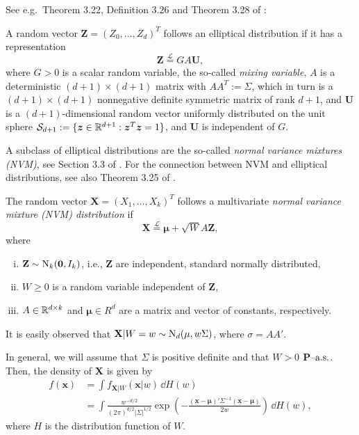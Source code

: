 \providecommand{\bZ}{\ensuremath{\bm{Z}}}
\providecommand{\bU}{\ensuremath{\bm{U}}}
\providecommand{\bu}{\ensuremath{\bm{u}}}

See e.g.\ Theorem 3.22, Definition 3.26 and Theorem 3.28 of
\citep{McNeil2005}:
\begin{definition}
  A random vector $\bZ=(Z_0,\ldots, Z_d)^T$ follows an elliptical
  distribution if it has a representation
  \begin{equation*}
    \bZ\stackrel{\mathcal L}= G A \bU,
  \end{equation*}
  where $G>0$ is a scalar random variable, the so-called {\em mixing
  variable}, $A$ is a deterministic $(d+1)\times (d+1)$ matrix with
$A A^T:=\Sigma$, which in turn is a $(d+1)\times (d+1)$ nonnegative
definite symmetric matrix of rank $d+1$, and $\bU$ is a
$(d+1)$-dimensional random vector uniformly distributed on the unit
sphere $\mathcal S_{d+1}:=\{\bm{z}\in {\mathbb{R}}^{d+1}: \bm z^T \bm z=1\}$,
and $\bU$ is independent of $G$.
\end{definition}

A subclass of elliptical distributions are the so-called {\em normal
  variance mixtures (NVM)}, see Section 3.3 of \citep{McNeil2005}. For the
connection between NVM and elliptical distributions, see also Theorem
3.25 of \citep{McNeil2005}. 

\begin{definition}
  The random vector $\mathbf X=(X_1, \ldots, X_k)^T$ follows a
  multivariate {\em normal variance mixture (NVM) distribution} if
  \begin{equation*}
    \mathbf X \stackrel{\mathcal L}{=} \mathbf \mu + \sqrt{W} A\mathbf
    Z, 
  \end{equation*}
  where
  \begin{enumerate}[(i)]
  \item $\mathbf Z\sim {\rm N}_k(\mathbf 0, I_k)$, i.e., $\mathbf Z$ are
    independent, standard normally distributed,
  \item $W\geq 0$ is a random variable independent of $\mathbf Z$,
  \item $A\in {\mathbb{R}}^{d\times k}$ and $\mathbf \mu\in R^d$ are a matrix
    and vector of constants, respectively. 
  \end{enumerate}
\end{definition}

It is easily observed that $\mathbf X|W=w \sim {\rm N}_d(\mathbf \mu,
w\Sigma)$, where $\sigma = A A'$.

In general, we will assume that $\Sigma$ is positive definite and that
$W>0$ $\text{{\bf P}--a.s.}$. Then, the density of $\mathbf X$ is given by
\begin{align*}
  f(\mathbf x) &= \int f_{\mathbf X|W} (\mathbf x|w)\, \dd H(w)\\
  &= \int \frac{w^{-d/2}} {(2\pi)^{d/2} |\Sigma|^{1/2}} \exp\left( -
    \frac{(\mathbf x-\mathbf \mu)' \Sigma^{-1} (\mathbf x-\mathbf
    \mu)} {2w} \right)\, \dd H(w),
\end{align*}
where $H$ is the distribution function of $W$.

